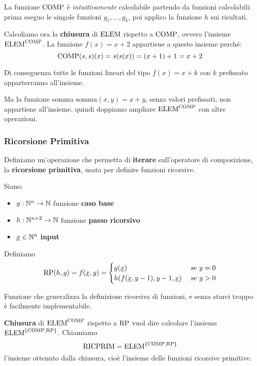 La funzione $\text{COMP}$ è \textit{intuitivamente} calcolabile partendo da funzioni calcolabili: prima eseguo le singole funzioni $g_1, \dots, g_k$, poi applico la funzione $h$ sui risultati.

Calcoliamo ora la \textbf{chiusura} di $\text{ELEM}$ rispetto a $\text{COMP}$, ovvero l'insieme $\text{ELEM}^{\text{COMP}}$. La funzione $f(x) = x + 2$ appartiene a questo insieme perché:
$$ \text{COMP}(s,s)(x) = s(s(x)) = (x + 1) + 1 = x + 2 $$

Di conseguenza tutte le funzioni lineari del tipo $f(x) = x + k$ con $k$ prefissato apparterranno all'insieme. 

Ma la funzione somma $\text{somma}(x,y) = x+y$, senza valori prefissati, non appartiene all'insieme, quindi doppiamo ampliare $\text{ELEM}^{\text{COMP}}$ con altre operazioni.

\subsubsection{Ricorsione Primitiva}

Definiamo un'operazione che permetta di \textbf{iterare} sull'operatore di composizione, la \textbf{ricorsione primitiva}, usata per definire funzioni ricorsive.

Siano:
\begin{itemize}
	\item $g: \mathbb{N}^n \rightarrow \mathbb{N}$ funzione \textbf{caso base}

	\item $h: \mathbb{N}^{n+2} \rightarrow \mathbb{N}$ funzione \textbf{passo ricorsivo}

	\item $\underline{x} \in \mathbb{N}^n$ \textbf{input}
\end{itemize}

Definiamo
$$
\text{RP} (h,g) = f(\underline{x}, y) = \begin{cases}
	g(\underline{x}) & \text{ se } y = 0 \\
	h(f(\underline{x}, y-1), y-1, \underline{x}) & \text{ se } y > 0 \\
\end{cases}
$$

Funzione che generalizza la definizione ricorsiva di funzioni, e senza starci troppo è facilmente implementabile.

\textbf{Chiusura} di $\text{ELEM}^{\text{COMP}}$ rispetto a $\text{RP}$ vuol dire calcolare l'insieme $\text{ELEM}^{\{\text{COMP}, \text{RP}\}}$. Chiamiamo
$$ \text{RICPRIM} = \text{ELEM}^{\{\text{COMP}, \text{RP}\}} $$
l'insieme ottenuto dalla chiusura, cioè l'insieme delle funzioni ricorsive primitive.

